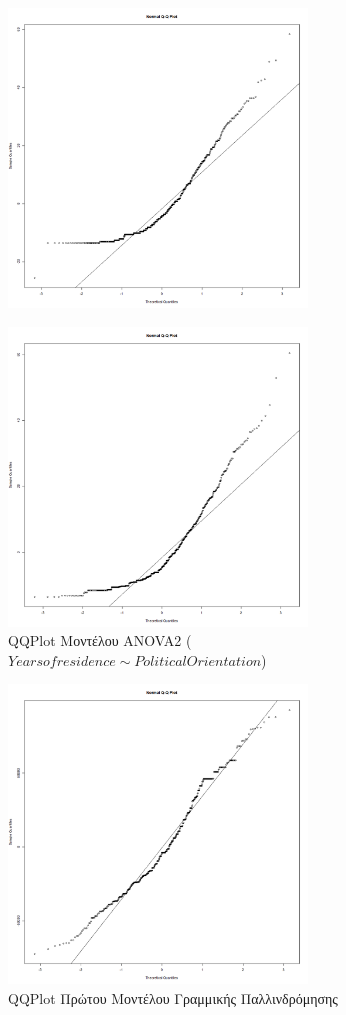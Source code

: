 \documentclass[10pt, letterpaper]{article}
\begin{document}
\begin{center}
\begin{figure}[h]
                \centering
                \includegraphics[width=300px, keepaspectratio]{resources/Anova1_Plot.png}
            \end{figure}
            \newpage
            \begin{figure}[h]
                \caption{QQPlot Μοντέλου ANOVA2 ($Yearsofresidence \sim PoliticalOrientation$)}
                \label{anova2plot}
                \centering
                \includegraphics[width=300px, keepaspectratio]{resources/Anova2_Plot.png}
            \end{figure}
            \newpage
            \begin{figure}[h]
                \caption{QQPlot Πρώτου Μοντέλου Γραμμικής Παλλινδρόμησης}
                \label{model1plot}
                \centering
                \includegraphics[width=300px, keepaspectratio]{resources/Model1_Plot.png}

\end{figure}
\end{center}
\end{document}
